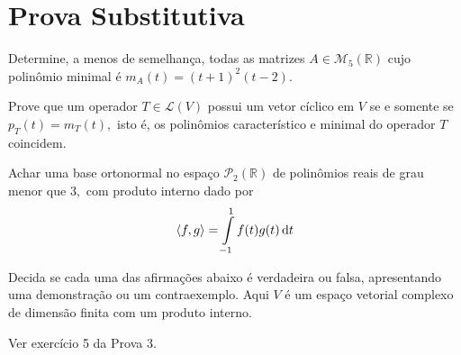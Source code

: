 \documentclass[11pt,a4paper]{article}
\begin{document}
\section{\textcolor{Floresta}{Prova Substitutiva}}
\begin{exercicio}
Determine, a menos de semelhança, todas as matrizes $A \in \mathcal{M}_5(\mathbb{R})$ cujo polinômio minimal é $m_A(t) = (t+1)^2(t-2).$
\end{exercicio}
\solucao{}
\begin{exercicio}
Prove que um operador $T \in \mathcal{L}(V)$ possui um vetor cíclico em $V$ se e somente se $p_T(t) = m_T(t),$ isto é, os polinômios característico e minimal do operador $T$ coincidem.
\end{exercicio}
\solucao{}
\begin{exercicio}
Achar uma base ortonormal no espaço $\mathcal{P}_2(\mathbb{R})$ de polinômios reais de grau menor que $3,$ com produto interno dado por
\[
\prin{f,g} = \int\limits_{-1}^1 f(t) g(t) \dif t
\]
\end{exercicio}
\solucao{}
\begin{exercicio}
Decida se cada uma das afirmações abaixo é verdadeira ou falsa, apresentando uma demonstração ou um contraexemplo. Aqui $V$ é um espaço vetorial complexo de dimensão finita com um produto interno.
\end{exercicio}
\solucao{}
\begin{exercicio}
Ver exercício 5 da Prova 3.
\end{exercicio}
 
\end{document}
